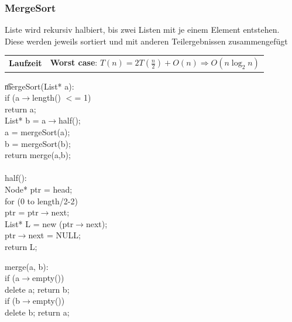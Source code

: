 \begin{sectionbox}
    \subsubsection{MergeSort}
    Liste wird rekursiv halbiert, bis zwei Listen mit je einem Element entstehen. Diese werden jeweils sortiert und mit anderen Teilergebnissen zusammengefügt
    \begin{tabularx}{\linewidth}{@{}>{\bfseries}l@{\hspace{.5em}}|X@{}}
        Laufzeit & \textbf{Worst case}: $T(n) = 2T(\frac{n}{2}) + O(n) \Rightarrow O(n\log_2 n)$
    \end{tabularx}

    \begin{sectionbox}
        \parbox{4cm}{
            \t{mergeSort(List* a):\\
                if (a$\rightarrow$length() $<$= 1)\\
                \hspace*{1em} return a;\\
                List* b = a$\rightarrow$half();\\
                a = mergeSort(a);\\
                b = mergeSort(b);\\
                return merge(a,b);\\
                \\
                half():\\
                Node* ptr = head;\\
                for (0 to length/2-2)\\
                \hspace*{1em} ptr = ptr$\rightarrow$next;\\
                List* L = new (ptr$\rightarrow$next);\\
                ptr$\rightarrow$next = NULL;\\
                return L;
            }}\hspace{-0.6cm}
        \parbox{2.9cm}{
            \t{
                merge(a, b):\\
                if (a$\rightarrow$empty())\\
                \hspace*{1em} delete a; return b;\\
                if (b$\rightarrow$empty())\\
                \hspace*{1em} delete b; return a;\\
}}
\end{sectionbox}
\end{sectionbox}
